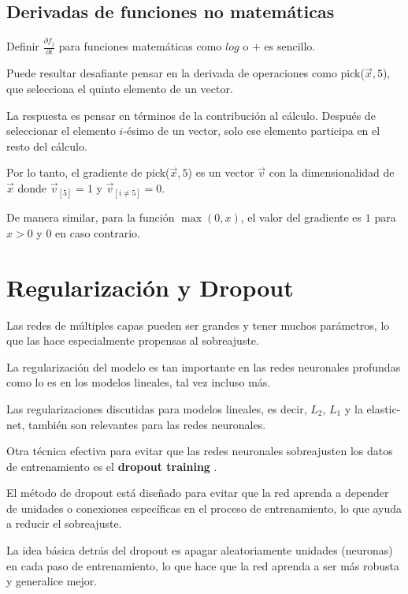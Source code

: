 
\subsection{Derivadas de funciones no matemáticas}
Definir $\frac{\partial f_j}{\partial i}$ para funciones matemáticas como $log$ o $+$ es sencillo.

Puede resultar desafiante pensar en la derivada de operaciones como pick($\vec{x},5$), que selecciona el quinto elemento de un vector.

La respuesta es pensar en términos de la contribución al cálculo. Después de seleccionar el elemento $i$-ésimo de un vector, solo ese elemento participa en el resto del cálculo.

Por lo tanto, el gradiente de pick($\vec{x},5$) es un vector $\vec{v}$ con la dimensionalidad de $\vec{x}$ donde $\vec{v}_{[5]} = 1$ y $\vec{v}_{[i \neq 5]} = 0$.

De manera similar, para la función $\max(0,x)$, el valor del gradiente es $1$ para $x > 0$ y $0$ en caso contrario.

\section{Regularización y Dropout}
Las redes de múltiples capas pueden ser grandes y tener muchos parámetros, lo que las hace especialmente propensas al sobreajuste.

La regularización del modelo es tan importante en las redes neuronales profundas como lo es en los modelos lineales, tal vez incluso más.

Las regularizaciones discutidas para modelos lineales, es decir, $L_2$, $L_1$ y la elastic-net, también son relevantes para las redes neuronales.

Otra técnica efectiva para evitar que las redes neuronales sobreajusten los datos de entrenamiento es el \textbf{dropout training} \cite{srivastava2014dropout}.

El método de dropout está diseñado para evitar que la red aprenda a depender de unidades o conexiones específicas en el proceso de entrenamiento, lo que ayuda a reducir el sobreajuste.

La idea básica detrás del dropout es apagar aleatoriamente unidades (neuronas) en cada paso de entrenamiento, lo que hace que la red aprenda a ser más robusta y generalice mejor.

